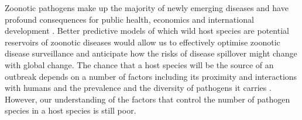 

Zoonotic pathogens make up the majority of newly emerging diseases and have profound consequences for public health, economics and international development \cite{jones2008global, smith2014global, ebolaWorldbank}.
Better predictive models of which wild host species are potential reservoirs of zoonotic diseases would allow us to effectively optimise zoonotic disease surveillance and anticipate how the risks of disease spillover might change with global change.
The chance that a host species will be the source of an outbreak depends on a number of factors including its proximity and interactions with humans and the prevalence and the diversity of pathogens it carries \cite{wolfe2000deforestation}.
However, our understanding of the factors that control the number of pathogen species in a host species is still poor.



